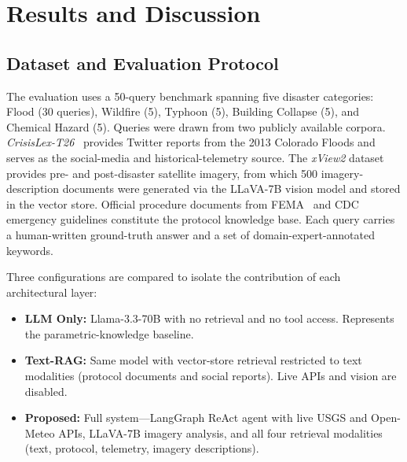 
\section{Results and Discussion}
\label{sec:results}

\subsection{Dataset and Evaluation Protocol}
\label{sec:dataset}

The evaluation uses a 50-query benchmark spanning five disaster
categories: Flood (30 queries), Wildfire (5), Typhoon (5), Building
Collapse (5), and Chemical Hazard (5). Queries were drawn from two
publicly available corpora. \textit{CrisisLex-T26}~\cite{olteanu2014crisislex}
provides Twitter reports from the 2013 Colorado Floods and serves as
the social-media and historical-telemetry source. The
\textit{xView2} dataset~\cite{gupta2019xview2} provides pre- and
post-disaster satellite imagery, from which 500 imagery-description
documents were generated via the LLaVA-7B vision model and stored in
the vector store. Official procedure documents from
FEMA~\cite{fema2021nrp} and CDC emergency guidelines constitute the
protocol knowledge base. Each query carries a human-written
ground-truth answer and a set of domain-expert-annotated keywords.

Three configurations are compared to isolate the contribution of each
architectural layer:

\begin{itemize}
  \item \textbf{LLM Only:} Llama-3.3-70B with no retrieval and no
        tool access. Represents the parametric-knowledge baseline.
  \item \textbf{Text-RAG:} Same model with vector-store retrieval
        restricted to text modalities (protocol documents and social
        reports). Live APIs and vision are disabled.
  \item \textbf{Proposed:} Full system—LangGraph ReAct agent with
        live USGS and Open-Meteo APIs, LLaVA-7B imagery analysis,
        and all four retrieval modalities (text, protocol, telemetry,
        imagery descriptions).
\end{itemize}

